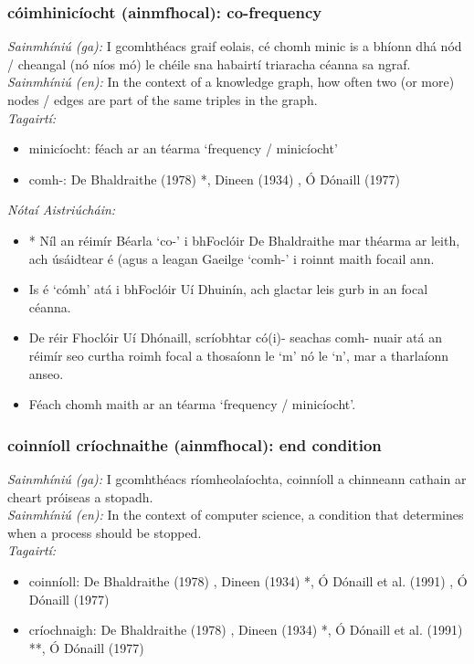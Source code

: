 \subsubsection*{cóimhinicíocht (ainmfhocal): co-frequency}
 \noindent \textit{Sainmhíniú (ga):} I gcomhthéacs graif eolais, cé chomh minic is a bhíonn dhá nód / cheangal (nó níos mó) le chéile sna habairtí triaracha céanna sa ngraf.
\\
 \noindent \textit{Sainmhíniú (en):} In the context of a knowledge graph, how often two (or more) nodes / edges are part of the same triples in the graph.
\\
 \noindent \textit{Tagairtí:}
\begin{itemize}
	\item minicíocht: féach ar an téarma `frequency / minicíocht'
	\item comh-: De Bhaldraithe (1978) \cite{de-bhaldraithe}*, Dineen (1934) \cite{dineen}, Ó Dónaill (1977) \cite{odonaill}
\end{itemize}

 \noindent \textit{Nótaí Aistriúcháin:}
\begin{itemize}
	\item * Níl an réimír Béarla `co-' i bhFoclóir De Bhaldraithe mar théarma ar leith, ach úsáidtear é (agus a leagan Gaeilge `comh-' i roinnt maith focail ann.
	\item Is é `cómh' atá i bhFoclóir Uí Dhuinín, ach glactar leis gurb in an focal céanna.
	\item De réir Fhoclóir Uí Dhónaill, scríobhtar có(i)- seachas comh- nuair atá an réimír seo curtha roimh focal a thosaíonn le `m' nó le `n', mar a tharlaíonn anseo.
	\item Féach chomh maith ar an téarma `frequency / minicíocht'.
\end{itemize}


\subsubsection*{coinníoll críochnaithe (ainmfhocal): end condition}
 \noindent \textit{Sainmhíniú (ga):} I gcomhthéacs ríomheolaíochta, coinníoll a chinneann cathain ar cheart próiseas a stopadh.
\\
 \noindent \textit{Sainmhíniú (en):} In the context of computer science, a condition that determines when a process should be stopped.
\\
 \noindent \textit{Tagairtí:}
\begin{itemize}
	\item coinníoll: De Bhaldraithe (1978) \cite{de-bhaldraithe}, Dineen (1934) \cite{dineen}*, Ó Dónaill et al. (1991) \cite{focloir-beag}, Ó Dónaill (1977) \cite{odonaill}
	\item críochnaigh: De Bhaldraithe (1978) \cite{de-bhaldraithe}, Dineen (1934) \cite{dineen}*, Ó Dónaill et al. (1991) \cite{focloir-beag}**, Ó Dónaill (1977) \cite{odonaill}
\end{itemize}

